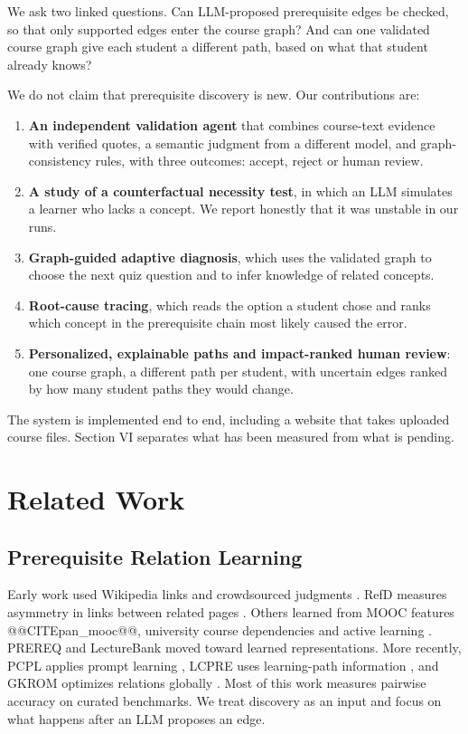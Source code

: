 \documentclass[conference]{IEEEtran}
\begin{document}
We ask two linked questions. Can LLM-proposed prerequisite edges be checked, so that only supported edges enter the course graph? And can one validated course graph give each student a different path, based on what that student already knows?

We do not claim that prerequisite discovery is new. Our contributions are:

\begin{enumerate}
\item \textbf{An independent validation agent} that combines course-text evidence with verified quotes, a semantic judgment from a different model, and graph-consistency rules, with three outcomes: accept, reject or human review.
\item \textbf{A study of a counterfactual necessity test}, in which an LLM simulates a learner who lacks a concept. We report honestly that it was unstable in our runs.
\item \textbf{Graph-guided adaptive diagnosis}, which uses the validated graph to choose the next quiz question and to infer knowledge of related concepts.
\item \textbf{Root-cause tracing}, which reads the option a student chose and ranks which concept in the prerequisite chain most likely caused the error.
\item \textbf{Personalized, explainable paths and impact-ranked human review}: one course graph, a different path per student, with uncertain edges ranked by how many student paths they would change.
\end{enumerate}
The system is implemented end to end, including a website that takes uploaded course files. Section VI separates what has been measured from what is pending.

\section{Related Work}
\subsection{Prerequisite Relation Learning}
Early work used Wikipedia links and crowdsourced judgments \cite{talukdar}. RefD measures asymmetry in links between related pages \cite{refd}. Others learned from MOOC features @@CITEpan\_mooc@@, university course dependencies \cite{liang17} and active learning \cite{liang18}. PREREQ \cite{prereq} and LectureBank \cite{lecturebank} moved toward learned representations. More recently, PCPL applies prompt learning \cite{pcpl}, LCPRE uses learning-path information \cite{lcpre}, and GKROM optimizes relations globally \cite{gkrom}. Most of this work measures pairwise accuracy on curated benchmarks. We treat discovery as an input and focus on what happens after an LLM proposes an edge.
\end{document}
